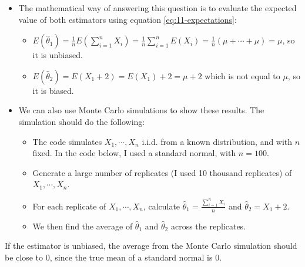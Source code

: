 \documentclass[
]{book}
\providecommand{\tightlist}{%
  \setlength{\itemsep}{0pt}\setlength{\parskip}{0pt}}
\theoremstyle{definition}
\theoremstyle{definition}
\theoremstyle{definition}
\theoremstyle{definition}
\theoremstyle{remark}
\begin{document}
\begin{itemize}
\item
  The mathematical way of answering this question is to evaluate the expected value of both estimators using equation \eqref{eq:11-expectations}:

  \begin{itemize}
  \item
    \(E(\hat{\theta}_1) = \frac{1}{n}E(\sum_{i=1}^n X_i) = \frac{1}{n}\sum_{i=1}^n E(X_i) = \frac{1}{n}(\mu + \cdots + \mu) = \mu\), so it is unbiased.
  \item
    \(E(\hat{\theta}_2) = E(X_1 + 2) = E(X_1) + 2 = \mu +2\) which is not equal to \(\mu\), so it is biased.
  \end{itemize}
\item
  We can also use Monte Carlo simulations to show these results. The simulation should do the following:

  \begin{itemize}
  \tightlist
  \item
    The code simulates \(X_1, \cdots, X_{n}\) i.i.d. from a known distribution, and with \(n\) fixed. In the code below, I used a standard normal, with \(n=100\).\\
  \item
    Generate a large number of replicates (I used 10 thousand replicates) of \(X_1, \cdots, X_{n}\).
  \item
    For each replicate of \(X_1, \cdots, X_{n}\), calculate \(\hat{\theta}_1 = \frac{\sum_{i=1}^n X_i}{n}\) and \(\hat{\theta}_2 = X_1 + 2\).
  \item
    We then find the average of \(\hat{\theta}_1\) and \(\hat{\theta}_2\) across the replicates.
  \end{itemize}
\end{itemize}

If the estimator is unbiased, the average from the Monte Carlo simulation should be close to 0, since the true mean of a standard normal is 0.
\end{document}
